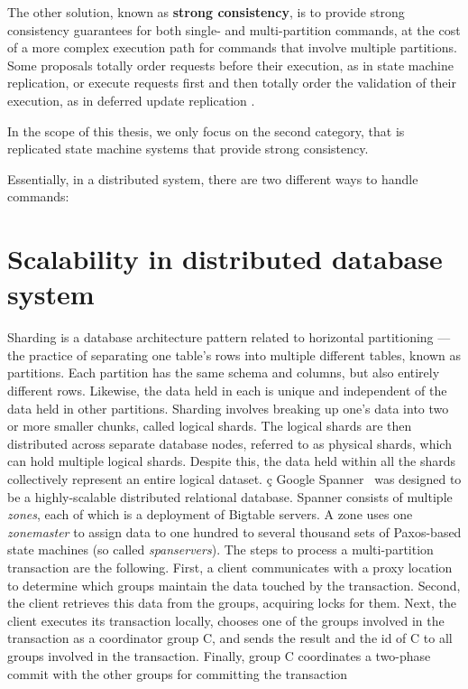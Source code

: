 The other solution, known as \textbf{strong consistency}, is to provide strong
consistency guarantees for both single- and multi-partition commands, at the
cost of a more complex execution path for commands that involve multiple
partitions. Some proposals totally order requests before their execution, as in
state machine replication, or execute requests first and then totally
order the validation of their execution, as in deferred update replication
\cite{pedone:smrdb}.

In the scope of this thesis, we only focus on the second
category, that is replicated state machine systems that provide strong
consistency.

Essentially, in a distributed system, there are two different ways to handle
commands:


\section{Scalability in distributed database system}

Sharding is a database architecture pattern related to horizontal partitioning —
the practice of separating one table’s rows into multiple different tables,
known as partitions. Each partition has the same schema and columns, but also
entirely different rows. Likewise, the data held in each is unique and
independent of the data held in other partitions. Sharding involves breaking up
one’s data into two or more smaller chunks, called logical shards. The logical
shards are then distributed across separate database nodes, referred to as
physical shards, which can hold multiple logical shards. Despite this, the data
held within all the shards collectively represent an entire logical dataset.
ç
Google Spanner~\cite{corbett2013spanner} was designed to be a highly-scalable
distributed relational database. Spanner consists of multiple \emph{zones}, each
of which is a deployment of Bigtable servers. A zone uses one \emph{zonemaster}
to assign data to one hundred to several thousand sets of Paxos-based state
machines (so called \emph{spanservers}).
The steps to process a multi-partition transaction are the following. First, a
client communicates with a proxy location to determine which groups maintain the
data touched by the transaction. Second, the client retrieves this data from the
groups, acquiring locks for them. Next, the client executes its transaction
locally, chooses one of the groups involved in the transaction as a coordinator
group C, and sends the result and the id of C to all groups involved in the
transaction. Finally, group C coordinates a two-phase commit with the other
groups for committing the transaction

